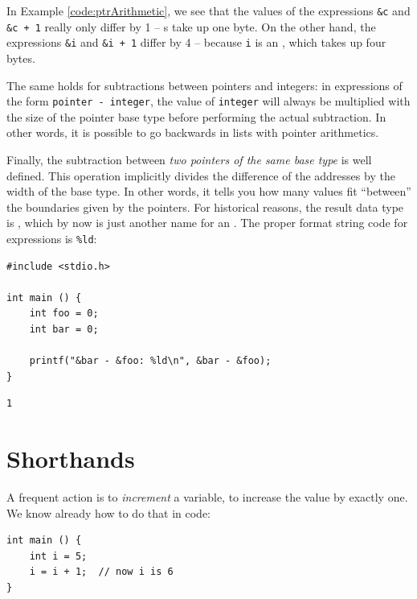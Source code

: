 {{{{In Example \ref{code:ptrArithmetic}, we see that the values of the expressions \texttt{\&c} and \texttt{\&c + 1} really only differ by 1 -- s take up one byte. On the other hand, the expressions \texttt{\&i} and \texttt{\&i + 1} differ by 4 -- because \texttt{i} is an , which takes up four bytes.

The same holds for subtractions between pointers and integers: in expressions of the form \texttt{pointer - integer}, the value of \texttt{integer} will always be multiplied with the size of the pointer base type before performing the actual subtraction. In other words, it is possible to go backwards in lists with pointer arithmetics.

Finally, the subtraction between \emph{two pointers of the same base type} is well defined. This operation implicitly divides the difference of the addresses by the width of the base type. In other words, it tells you how many values fit \enquote{between} the boundaries given by the pointers. For historical reasons, the result data type is , which by now is just another name for an . The proper format string code for  expressions is \texttt{\%ld}:

\begin{codebox}[pointerDifference.c]
\begin{verbatim}
#include <stdio.h>

int main () {
    int foo = 0;
    int bar = 0;

    printf("&bar - &foo: %ld\n", &bar - &foo);
}
\end{verbatim}
\end{codebox}
%
\begin{cmdbox}
\begin{verbatim}
1
\end{verbatim}
\end{cmdbox}


\section{Shorthands} \label{sec:Shorthands}
A frequent action is to \emph{increment} a variable, \ie to increase the value by exactly one. We know already how to do that in code:
\begin{codebox}[explicitIncrement.c]
\begin{verbatim}
int main () {
    int i = 5;
    i = i + 1;  // now i is 6
}
\end{verbatim}
\end{codebox}

}}}}
